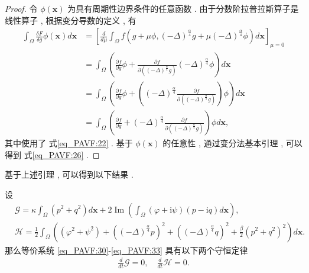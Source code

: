 \begin{proof}
	令 $\phi(\boldsymbol{x})$ 为具有周期性边界条件的任意函数 . 由于分数阶拉普拉斯算子是线性算子 , 根据变分导数的定义 , 有
\begin{equation}
\begin{aligned}
\int_{\Omega} \frac{\delta F}{\delta g} \phi(\boldsymbol{x}) d \boldsymbol{x} &=\left[\frac{d}{d \mu} \int_{\Omega} f\left(g+\mu \phi , (-\Delta)^{\frac{\alpha}{4}} g+\mu(-\Delta)^{\frac{\alpha}{4}} \phi\right) d \boldsymbol{x}\right]_{\mu=0} \\
&=\int_{\Omega}\left(\frac{\partial f}{\partial g} \phi+\frac{\partial f}{\partial\left((-\Delta)^{\frac{\alpha}{4}} g\right)}(-\Delta)^{\frac{\alpha}{4}} \phi\right) d \boldsymbol{x}\\
&=\int_{\Omega}\left(\frac{\partial f}{\partial g} \phi+\left((-\Delta)^{\frac{\alpha}{4}} \frac{\partial f}{\partial\left((-\Delta)^{\frac{\alpha}{4}} g\right)}\right) \phi\right) d \boldsymbol{x} \\
&=\int_{\Omega}\left(\frac{\partial f}{\partial g}+(-\Delta)^{\frac{\alpha}{4}} \frac{\partial f}{\partial\left((-\Delta)^{\frac{\alpha}{4}} g\right)}\right) \phi d \boldsymbol{x} , 
\end{aligned}
\label{eq_27}\end{equation}
其中使用了 式\eqref{eq_PAVF:22} . 基于 $\phi(\boldsymbol{x})$ 的任意性 , 通过变分法基本引理 , 可以得到 式\eqref{eq_PAVF:26} . 

\end{proof}

基于上述引理 , 可以得到以下结果 . 

\begin{theorem}	\label{thm_PAVF:2_1}
设
\begin{align}
&\mathcal{G}=\kappa\int_{\Omega}(p^2+q^2) d \boldsymbol{x}+2\operatorname{Im}(\int_{\Omega}(\varphi+\mathrm{i}\psi)(p-\mathrm{i}q)d \boldsymbol{x}) , \label{eq_PAVF:34} \\
&\mathcal{H}=\frac{1}{2}\int_{\Omega}\left((\varphi^2+\psi^2)+\left((-\Delta)^{\frac{\alpha}{4}} p\right)^{2}+\left((-\Delta)^{\frac{\alpha}{4}} q\right)^{2}+\frac{\beta}{2}(p^2+q^2)^{2}\right) d \boldsymbol{x} . \label{eq_PAVF:35}
\end{align}
那么等价系统 \eqref{eq_PAVF:30}-\eqref{eq_PAVF:33} 具有以下两个守恒定律
\begin{align}
\frac{d}{d t} \mathcal{G}=0 , \quad \frac{d}{d t} \mathcal{H}=0 . 
\end{align}
\end{theorem}

